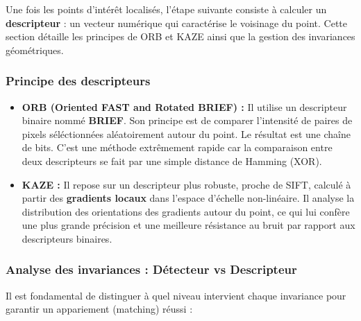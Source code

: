 \documentclass[11pt,a4paper]{article}
\begin{document}
Une fois les points d'intérêt localisés, l'étape suivante consiste à calculer un \textbf{descripteur} : un vecteur numérique qui caractérise le voisinage du point. Cette section détaille les principes de ORB et KAZE ainsi que la gestion des invariances géométriques.

\subsubsection{Principe des descripteurs}

\begin{itemize}
    \item \textbf{ORB (Oriented FAST and Rotated BRIEF) :} Il utilise un descripteur binaire nommé \textbf{BRIEF}. Son principe est de comparer l'intensité de paires de pixels séléctionnées aléatoirement autour du point. Le résultat est une chaîne de bits. C'est une méthode extrêmement rapide car la comparaison entre deux descripteurs se fait par une simple distance de Hamming (XOR).
    
    \item \textbf{KAZE :} Il repose sur un descripteur plus robuste, proche de SIFT, calculé à partir des \textbf{gradients locaux} dans l'espace d'échelle non-linéaire. Il analyse la distribution des orientations des gradients autour du point, ce qui lui confère une plus grande précision et une meilleure résistance au bruit par rapport aux descripteurs binaires.
\end{itemize}



\subsubsection{Analyse des invariances : Détecteur vs Descripteur}

Il est fondamental de distinguer à quel niveau intervient chaque invariance pour garantir un appariement (matching) réussi :
\end{document}
